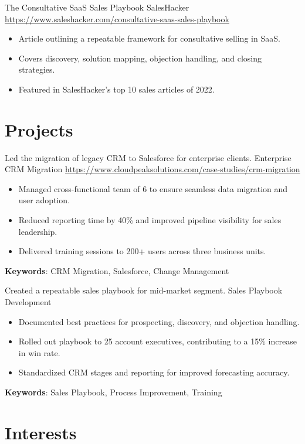 \documentclass[a4paper, serif, 10pt]{moderncv}
\begin{document}
        {The Consultative SaaS Sales Playbook}
        {SalesHacker}
        {\url{https://www.saleshacker.com/consultative-saas-sales-playbook}}
        {}
        {\begin{itemize}
\item Article outlining a repeatable framework for consultative selling in SaaS.
\item Covers discovery, solution mapping, objection handling, and closing strategies.
\item Featured in SalesHacker's top 10 sales articles of 2022.
\end{itemize}}
\section{Projects}

        {Led the migration of legacy CRM to Salesforce for enterprise clients.}
        {Enterprise CRM Migration}
        {\url{https://www.cloudpeaksolutions.com/case-studies/crm-migration}}
        {}
        {\begin{itemize}
\item Managed cross-functional team of 6 to ensure seamless data migration and user adoption.
\item Reduced reporting time by 40\% and improved pipeline visibility for sales leadership.
\item Delivered training sessions to 200+ users across three business units.
\end{itemize}
\textbf{Keywords}: CRM Migration, Salesforce, Change Management}

        {Created a repeatable sales playbook for mid-market segment.}
        {Sales Playbook Development}
        {}
        {}
        {\begin{itemize}
\item Documented best practices for prospecting, discovery, and objection handling.
\item Rolled out playbook to 25 account executives, contributing to a 15\% increase in win rate.
\item Standardized CRM stages and reporting for improved forecasting accuracy.
\end{itemize}
\textbf{Keywords}: Sales Playbook, Process Improvement, Training}
\section{Interests}
\end{document}
